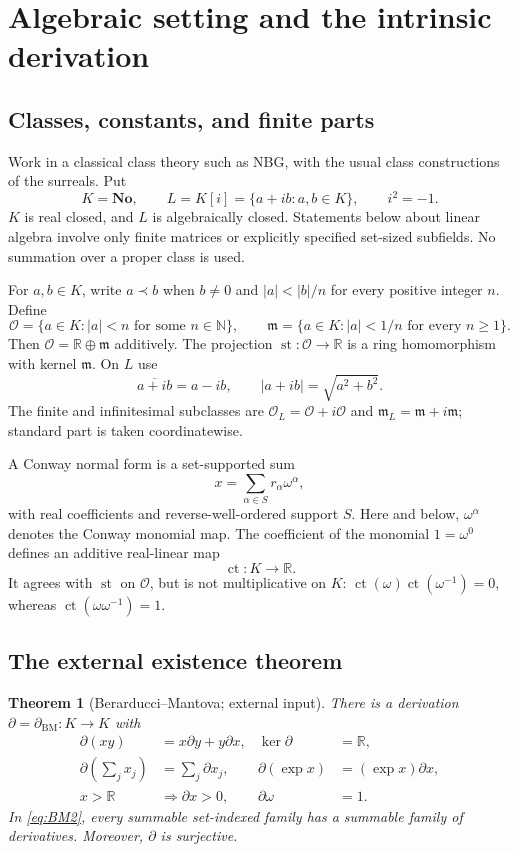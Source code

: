 \documentclass[11pt]{article}
\numberwithin{equation}{section}
\newtheorem{theorem}{Theorem}[section]
\theoremstyle{definition}
\newcommand{\No}{\mathbf{No}}
\newcommand{\R}{\mathbb R}
\newcommand{\N}{\mathbb N}
\newcommand{\OO}{\mathcal O}
\newcommand{\mm}{\mathfrak m}
\newcommand{\DD}{\partial}
\newcommand{\ct}{\operatorname{ct}}
\newcommand{\st}{\operatorname{st}}
\begin{document}
\section{Algebraic setting and the intrinsic derivation}
\label{sec:setting}

\subsection{Classes, constants, and finite parts}
Work in a classical class theory such as NBG, with the usual class
constructions of the surreals. Put
\[
 K=\No,\qquad L=K[i]=\{a+ib:a,b\in K\},\qquad i^2=-1.
\]
$K$ is real closed, and $L$ is algebraically closed. Statements below about
linear algebra involve only finite matrices or explicitly specified
set-sized subfields. No summation over a proper class is used.

For $a,b\in K$, write $a\prec b$ when $b\ne0$ and
$|a|<|b|/n$ for every positive integer $n$. Define
\[
 \OO=\{a\in K:|a|<n\text{ for some }n\in\N\},\qquad
 \mm=\{a\in K:|a|<1/n\text{ for every }n\ge1\}.
\]
Then $\OO=\R\oplus\mm$ additively. The projection
$\st:\OO\to\R$ is a ring homomorphism with kernel $\mm$.
On $L$ use
\[
 \overline{a+ib}=a-ib,\qquad |a+ib|=\sqrt{a^2+b^2}.
\]
The finite and infinitesimal subclasses are
$\OO_L=\OO+i\OO$ and $\mm_L=\mm+i\mm$; standard part is taken
coordinatewise.

A Conway normal form is a set-supported sum
\[
 x=\sum_{\alpha\in S}r_\alpha\omega^\alpha,
\]
with real coefficients and reverse-well-ordered support $S$. Here and below,
$\omega^\alpha$ denotes the Conway monomial map. The coefficient of the
monomial $1=\omega^0$ defines an additive real-linear map
\begin{equation}\label{eq:ct}
 \ct:K\longrightarrow\R.
\end{equation}
It agrees with $\st$ on $\OO$, but is not multiplicative on $K$:
$\ct(\omega)\ct(\omega^{-1})=0$, whereas
$\ct(\omega\omega^{-1})=1$.

\subsection{The external existence theorem}
\begin{theorem}[Berarducci--Mantova; external input]\label{thm:BM}
There is a derivation $\DD=\partial_{\mathrm{BM}}:K\to K$ with
\begin{align}
 \DD(xy)&=x\DD y+y\DD x, & \ker\DD&=\R,\label{eq:BM1}\\
 \DD\!\left(\sum_jx_j\right)&=\sum_j\DD x_j,
 &\DD(\exp x)&=(\exp x)\DD x,\label{eq:BM2}\\
 x>\R&\Longrightarrow\DD x>0,
 &\DD\omega&=1.\label{eq:BM3}
\end{align}
In \eqref{eq:BM2}, every summable set-indexed family has a summable family of
derivatives. Moreover, $\DD$ is surjective.
\end{theorem}
\end{document}
